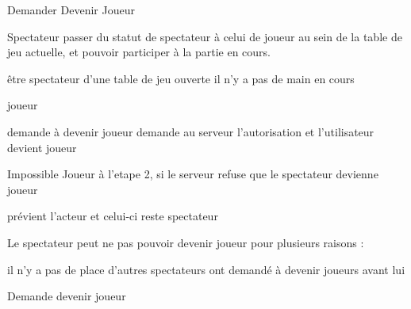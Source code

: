 \begin{usecase}{Demander Devenir Joueur}
	
	\begin{presentation}
		\actor Spectateur
		\goal passer du statut de spectateur à celui de joueur au sein de la 
		      table de jeu actuelle, et pouvoir participer à la partie en cours.
		
		\begin{precondition}
			\condition être spectateur d'une table de jeu ouverte
			\condition il n'y a pas de main en cours
		\end{precondition}
		
		\begin{postcondition}
			\condition joueur
		\end{postcondition}
		
		\begin{includeuc}
			\aucun
		\end{includeuc}
	\end{presentation}
	
	\begin{scenario}
		\start demande à devenir joueur
			\system demande au serveur l'autorisation et l'utilisateur devient 
			        joueur
	\end{scenario}
	
	\begin{alternative}
		\nomalt Impossible Joueur
			\condition à l'etape 2, si le serveur refuse que le spectateur 
			           devienne joueur
		
		\begin{alt}
			\system prévient l'acteur et celui-ci reste spectateur
		\end{alt}
	\end{alternative}
	
	\begin{regles}
		\nom Le spectateur peut ne pas pouvoir devenir joueur pour plusieurs 
		     raisons :
		
		\begin{enumerate}
			\regle il n'y a pas de place
			\regle d'autres spectateurs ont demandé à devenir joueurs avant lui
		\end{enumerate}
		
	\end{regles}
	
	                {Demande devenir joueur}
	
\end{usecase}

